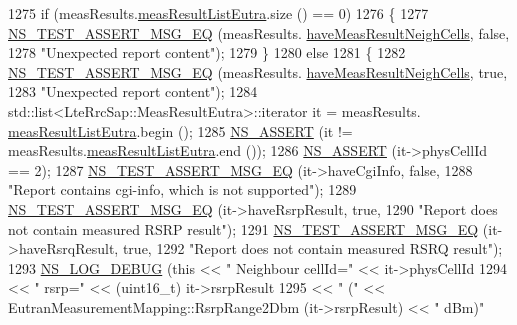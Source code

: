 \begin{DoxyCode}
1275       \textcolor{keywordflow}{if} (measResults.\hyperlink{structns3_1_1LteRrcSap_1_1MeasResults_a1fc2cdef154508dd522b46c71f854f03}{measResultListEutra}.size () == 0)
1276         \{
1277           \hyperlink{group__testing_ga2a9d78cffb3db8e867c35fff0b698cf5}{NS\_TEST\_ASSERT\_MSG\_EQ} (measResults.
      \hyperlink{structns3_1_1LteRrcSap_1_1MeasResults_a1a102ebfb647fe85739933dcd2532736}{haveMeasResultNeighCells}, \textcolor{keyword}{false},
1278                                  \textcolor{stringliteral}{"Unexpected report content"});
1279         \}
1280       \textcolor{keywordflow}{else}
1281         \{
1282           \hyperlink{group__testing_ga2a9d78cffb3db8e867c35fff0b698cf5}{NS\_TEST\_ASSERT\_MSG\_EQ} (measResults.
      \hyperlink{structns3_1_1LteRrcSap_1_1MeasResults_a1a102ebfb647fe85739933dcd2532736}{haveMeasResultNeighCells}, \textcolor{keyword}{true},
1283                                  \textcolor{stringliteral}{"Unexpected report content"});
1284           std::list<LteRrcSap::MeasResultEutra>::iterator it = measResults.
      \hyperlink{structns3_1_1LteRrcSap_1_1MeasResults_a1fc2cdef154508dd522b46c71f854f03}{measResultListEutra}.begin ();
1285           \hyperlink{assert_8h_a6dccdb0de9b252f60088ce281c49d052}{NS\_ASSERT} (it != measResults.\hyperlink{structns3_1_1LteRrcSap_1_1MeasResults_a1fc2cdef154508dd522b46c71f854f03}{measResultListEutra}.end ());
1286           \hyperlink{assert_8h_a6dccdb0de9b252f60088ce281c49d052}{NS\_ASSERT} (it->physCellId == 2);
1287           \hyperlink{group__testing_ga2a9d78cffb3db8e867c35fff0b698cf5}{NS\_TEST\_ASSERT\_MSG\_EQ} (it->haveCgiInfo, \textcolor{keyword}{false},
1288                                  \textcolor{stringliteral}{"Report contains cgi-info, which is not supported"});
1289           \hyperlink{group__testing_ga2a9d78cffb3db8e867c35fff0b698cf5}{NS\_TEST\_ASSERT\_MSG\_EQ} (it->haveRsrpResult, \textcolor{keyword}{true},
1290                                  \textcolor{stringliteral}{"Report does not contain measured RSRP result"});
1291           \hyperlink{group__testing_ga2a9d78cffb3db8e867c35fff0b698cf5}{NS\_TEST\_ASSERT\_MSG\_EQ} (it->haveRsrqResult, \textcolor{keyword}{true},
1292                                  \textcolor{stringliteral}{"Report does not contain measured RSRQ result"});
1293           \hyperlink{group__logging_ga413f1886406d49f59a6a0a89b77b4d0a}{NS\_LOG\_DEBUG} (\textcolor{keyword}{this} << \textcolor{stringliteral}{" Neighbour cellId="} << it->physCellId
1294                              << \textcolor{stringliteral}{" rsrp="} << (uint16\_t) it->rsrpResult
1295                              << \textcolor{stringliteral}{" ("} << EutranMeasurementMapping::RsrpRange2Dbm (it->rsrpResult) << \textcolor{stringliteral}{" dBm)"}

\end{DoxyCode}
